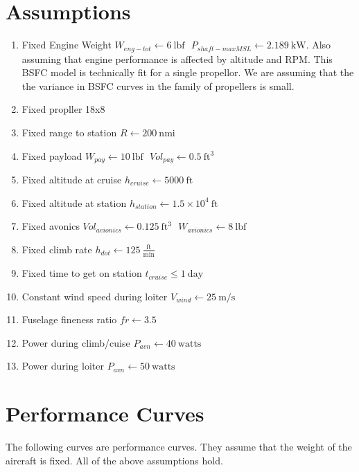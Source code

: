 \documentclass[10pt, a4paper]{article}
\begin{document}
\title{}
\author{Michael Burton}
\maketitle

\section*{Assumptions}

\begin{enumerate}
\item Fixed Engine Weight $ W_{eng-tot} \gets 6~\mathrm{lbf} \text{ } P_{shaft-maxMSL} \gets 2.189~\mathrm{kW} $.  Also assuming that engine performance is affected by altitude and RPM. This BSFC model is technically fit for a single propellor.  We are assuming that the the variance in BSFC curves in the family of propellers is small.  
\item Fixed propller 18x8
\item Fixed range to station $ R \gets 200~\mathrm{nmi} $
\item Fixed payload $ W_{pay} \gets 10~\mathrm{lbf} \text{ } Vol_{pay} \gets 0.5~\mathrm{ft^{3}} $
\item Fixed altitude at cruise $ h_{cruise} \gets 5000~\mathrm{ft} $
\item Fixed altitude at station $ h_{station} \gets 1.5 \times 10^{4}~\mathrm{ft} $
\item Fixed avonics $ Vol_{avionics} \gets 0.125~\mathrm{ft^{3}} \text{ } W_{avionics} \gets 8~\mathrm{lbf} $
\item Fixed climb rate $ h_{dot} \gets 125~\mathrm{\tfrac{ft}{min}} $
\item Fixed time to get on station  $ t_{cruise} \leq 1~\mathrm{day} $
\item Constant wind speed during loiter $ V_{wind} \gets 25~\mathrm{m/s} $
\item Fuselage fineness ratio $ fr \gets 3.5 $
\item Power during climb/cuise $ P_{avn} \gets 40~\mathrm{watts} $
\item Power during loiter  $ P_{avn} \gets 50~\mathrm{watts} $
\end{enumerate}
\newpage

\section*{Performance Curves}

The following curves are performance curves.  They assume that the weight of the aircraft is fixed. All of the above assumptions hold.  
\end{document}
